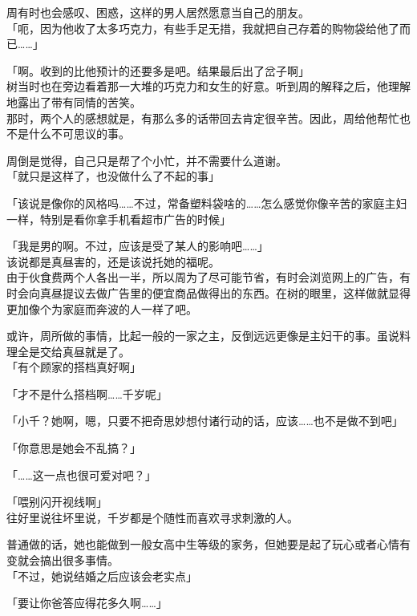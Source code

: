 周有时也会感叹、困惑，这样的男人居然愿意当自己的朋友。\\

「呃，因为他收了太多巧克力，有些手足无措，我就把自己存着的购物袋给他了而已……」

「啊。收到的比他预计的还要多是吧。结果最后出了岔子啊」\\

树当时也在旁边看着那一大堆的巧克力和女生的好意。听到周的解释之后，他理解地露出了带有同情的苦笑。\\

那时，两个人的感想就是，有那么多的话带回去肯定很辛苦。因此，周给他帮忙也不是什么不可思议的事。

周倒是觉得，自己只是帮了个小忙，并不需要什么道谢。\\

「就只是这样了，也没做什么了不起的事」

「该说是像你的风格吗……不过，常备塑料袋啥的……怎么感觉你像辛苦的家庭主妇一样，特别是看你拿手机看超市广告的时候」

「我是男的啊。不过，应该是受了某人的影响吧……」\\

该说都是真昼害的，还是该说托她的福呢。\\

由于伙食费两个人各出一半，所以周为了尽可能节省，有时会浏览网上的广告，有时会向真昼提议去做广告里的便宜商品做得出的东西。在树的眼里，这样做就显得更加像个为家庭而奔波的人一样了吧。

或许，周所做的事情，比起一般的一家之主，反倒远远更像是主妇干的事。虽说料理全是交给真昼就是了。\\

「有个顾家的搭档真好啊」

「才不是什么搭档啊……千岁呢」

「小千？她啊，嗯，只要不把奇思妙想付诸行动的话，应该……也不是做不到吧」

「你意思是她会不乱搞？」

「……这一点也很可爱对吧？」

「喂别闪开视线啊」\\

往好里说往坏里说，千岁都是个随性而喜欢寻求刺激的人。

普通做的话，她也能做到一般女高中生等级的家务，但她要是起了玩心或者心情有变就会搞出很多事情。\\

「不过，她说结婚之后应该会老实点」

「要让你爸答应得花多久啊……」\\

